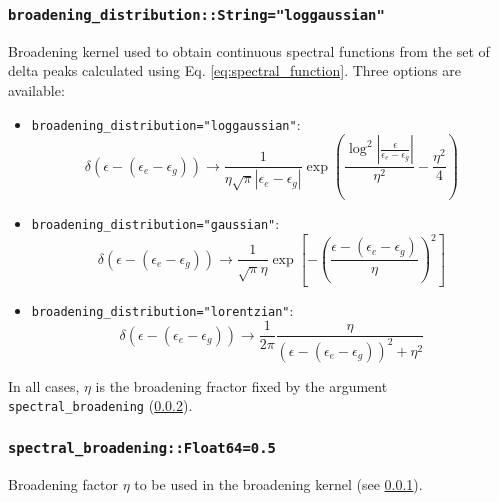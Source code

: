 \documentclass[notitlepage]{article}
\begin{document}
\subsubsection{\texttt{broadening\_distribution::String="loggaussian"}}
\label{nrg_broadeningdistribution}
Broadening kernel used to obtain continuous spectral
functions from the set of delta peaks calculated using Eq.
\ref{eq:spectral_function}. Three options are available:
\begin{itemize}
    \item \texttt{broadening\_distribution="loggaussian"}:
        \begin{equation}
            \delta(\epsilon-(\epsilon_e-\epsilon_g))
            \rightarrow
            \frac{1}{\eta \sqrt{\pi} |\epsilon_e-\epsilon_g|}
            \exp \left(
                \frac{\log^2
                |\frac{\epsilon}{\epsilon_e-\epsilon_g}|}{\eta^2}-
                \frac{\eta^2}{4}
            \right)
        \end{equation}
    \item \texttt{broadening\_distribution="gaussian"}:
        \begin{equation}
            \delta(\epsilon-(\epsilon_e-\epsilon_g))
            \rightarrow
            \frac{1}{\sqrt{\pi}\eta}
            \exp\left[
                -\left(
                    \frac{
                        \epsilon-(\epsilon_e-\epsilon_g)
                    }{
                        \eta
                    }
                \right)^2
            \right]
        \end{equation}
    \item \texttt{broadening\_distribution="lorentzian"}:
        \begin{equation}
            \delta(\epsilon-(\epsilon_e-\epsilon_g))
            \rightarrow
            \frac{1}{2\pi}
            \frac{
                \eta
            }{
                (\epsilon-(\epsilon_e-\epsilon_g))^2
                +\eta^2
            }
        \end{equation}
\end{itemize}
In all cases, $\eta$ is the broadening fractor fixed by the
argument \texttt{spectral\_broadening}
(\ref{nrg_spectralbroadening}).

\subsubsection{\texttt{spectral\_broadening::Float64=0.5}}
\label{nrg_spectralbroadening}
Broadening factor $\eta$ to be used in the broadening kernel
(see \ref{nrg_broadeningdistribution}).
\end{document}
